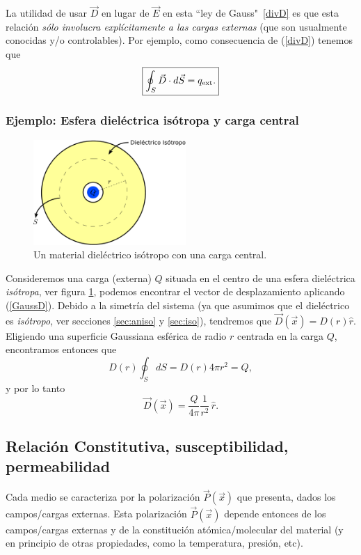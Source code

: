 La utilidad de usar $\vec{D}$ en lugar de $\vec{E}$ en esta ``ley de Gauss"
\,\eqref{divD} es que esta relación \textit{sólo involucra explícitamente a las cargas externas} (que son usualmente conocidas y/o controlables). Por ejemplo, como consecuencia de (\ref{divD}) tenemos que
\begin{equation}
 \boxed{\oint_S \vec{D}\cdot d\vec{S}=q_{\rm ext}.} \label{GaussD}
\end{equation}

\subsubsection{Ejemplo: Esfera dieléctrica isótropa y carga central}
\begin{figure}[!h]
\centerline{\includegraphics[height=4cm]{fig/fig-dielectrico-y-carga-01.pdf}}
\caption{Un material dieléctrico isótropo con una carga central.}
\label{diel02}
\end{figure}
Consideremos una carga (externa) $Q$ situada en el centro de una
esfera dieléctrica \textit{isótropa}, ver figura \ref{diel02}, podemos encontrar el vector de desplazamiento aplicando (\ref{GaussD}). Debido a la simetría del sistema (ya que asumimos que el dieléctrico es \textit{isótropo}, ver secciones \ref{sec:aniso} y \ref{sec:iso}), tendremos que $\vec{D}(\vec{x})=D(r)\hat{r}$. Eligiendo una superficie Gaussiana esférica de radio $r$ centrada en la carga $Q$, encontramos entonces que
\begin{equation}
 D(r)\oint_S dS=D(r)4\pi r^2=Q,
\end{equation}
y por lo tanto
\begin{equation}
 \vec{D}(\vec{x})=\frac{Q}{4\pi}\frac{1}{r^2}\,\hat{r}.
\end{equation}


\subsection{Relación Constitutiva, susceptibilidad, permeabilidad}

Cada medio se caracteriza por la polarización $\vec{P}(\vec{x})$ que presenta,
dados los campos/cargas externas. Esta polarización $\vec{P}(\vec{x})$ depende
entonces de los campos/cargas externas y de la constitución atómica/molecular
del material (y en principio de otras propiedades, como la temperatura,
presión, etc). 

